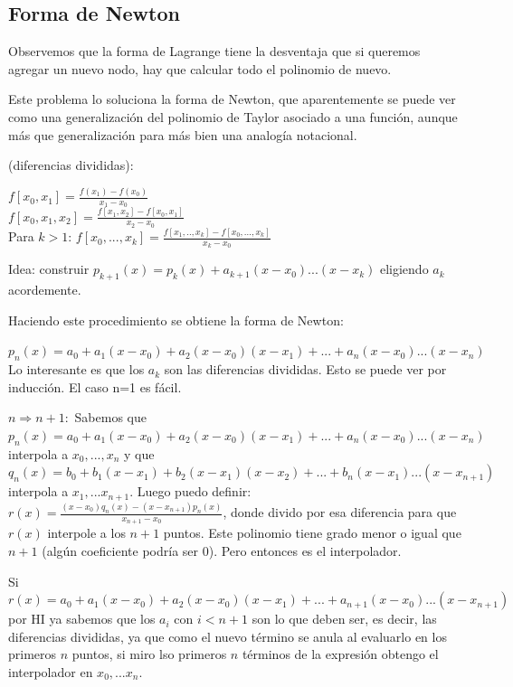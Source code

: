 \documentclass[10pt,a4paper,final]{report}
\begin{document}
\subsection{Forma de Newton}

Observemos que la forma de Lagrange tiene la desventaja que si queremos agregar un nuevo nodo, hay que calcular todo el polinomio de nuevo.

Este problema lo soluciona la forma de Newton, que aparentemente se puede ver como una generalización del polinomio de Taylor asociado a una función, aunque más que generalización para más bien una analogía notacional.


\begin{definition}(diferencias divididas):

$f[x_0,x_1]=\frac{f(x_1)-f(x_0)}{x_1-x_0}$\\

$f[x_0,x_1,x_2]=\frac{f[x_1,x_2]-f[x_0,x_1]}{x_2-x_0}$\\
Para $k>1$: $f[x_0,...,x_{k}]=\frac{f[x_1,..,x_{k}]-f[x_0,...,x_k]}{x_{k}-x_0}$
\end{definition}

Idea: construir $p_{k+1}(x) = p_k(x) + a_{k+1}(x-x_0)...(x-x_k)$ eligiendo $a_k$ acordemente.

Haciendo este procedimiento se obtiene la forma de Newton:

$p_n(x) = a_0 + a_1 (x-x_0) + a_2 (x-x_0)(x-x_1) + ... + a_n(x-x_0)...(x-x_n)$ \\

Lo interesante es que los $a_k$ son las diferencias divididas. Esto se puede ver por inducción. El caso n=1 es fácil.

$n\Rightarrow n+1: $ Sabemos que $p_n(x) = a_0 + a_1 (x-x_0) + a_2 (x-x_0)(x-x_1) + ... + a_n(x-x_0)...(x-x_n) $ interpola a $x_0,...,x_n$ y que 
$q_n(x) = b_0 + b_1 (x-x_1) + b_2 (x-x_1)(x-x_2) + ... + b_n(x-x_1)...(x-x_{n+1}) $ interpola a $x_1,...x_{n+1}$. Luego puedo definir:\\

$r(x) = \frac{(x-x_0) q_n(x) - (x-x_{n+1}) p_n(x)}{x_{n+1} - x_0}$, donde divido por esa diferencia para que $r(x)$ interpole a los $n+1$ puntos. Este polinomio tiene grado menor o igual  que $n+1$ (algún coeficiente podría ser 0). Pero entonces es el interpolador.

Si $r(x) = a_0 + a_1 (x-x_0) + a_2 (x-x_0)(x-x_1) + ... + a_{n+1}(x-x_0)...(x-x_{n+1})$ por HI ya sabemos que los $a_i$ con $i < n+1$ son lo que deben ser, es decir, las diferencias divididas, ya que como el nuevo término se anula al evaluarlo en los primeros $n$ puntos, si miro lso primeros $n$ términos de la expresión obtengo el interpolador en $x_0,...x_n$.
\end{document}
